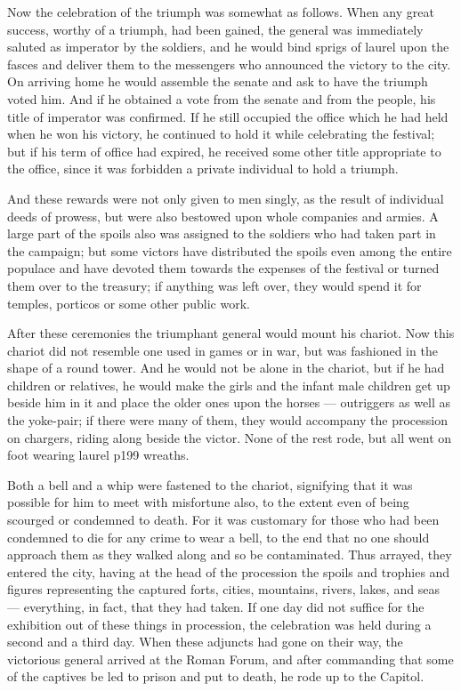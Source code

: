 Now the celebration of the triumph was somewhat as follows. When any great success, worthy of a triumph, had been gained, the general was immediately saluted as imperator by the soldiers, and he would bind sprigs of laurel upon the fasces and deliver them to the messengers who announced the victory to the city. On arriving home he would assemble the senate and ask to have the triumph voted him. And if he obtained a vote from the senate and from the people, his title of imperator was confirmed. If he still occupied the office which he had held when he won his victory, he continued to hold it while celebrating the festival; but if his term of office had expired, he received some other title appropriate to the office, since it was forbidden a private individual to hold a triumph.

And these rewards were not only given to men singly, as the result of individual deeds of prowess, but were also bestowed upon whole companies and armies. A large part of the spoils also was assigned to the soldiers who had taken part in the campaign; but some victors have distributed the spoils even among the entire populace and have devoted them towards the expenses of the festival or turned them over to the treasury; if anything was left over, they would spend it for temples, porticos or some other public work.

After these ceremonies the triumphant general would mount his chariot. Now this chariot did not resemble one used in games or in war, but was fashioned in the shape of a round tower. And he would not be alone in the chariot, but if he had children or relatives, he would make the girls and the infant male children get up beside him in it and place the older ones upon the horses \texthebrew{—} outriggers as well as the yoke-pair; if there were many of them, they would accompany the procession on chargers, riding along beside the victor. None of the rest rode, but all went on foot wearing laurel p199 wreaths.

Both a bell and a whip were fastened to the chariot, signifying that it was possible for him to meet with misfortune also, to the extent even of being scourged or condemned to death. For it was customary for those who had been condemned to die for any crime to wear a bell, to the end that no one should approach them as they walked along and so be contaminated. Thus arrayed, they entered the city, having at the head of the procession the spoils and trophies and figures representing the captured forts, cities, mountains, rivers, lakes, and seas \texthebrew{—} everything, in fact, that they had taken. If one day did not suffice for the exhibition out of these things in procession, the celebration was held during a second and a third day. When these adjuncts had gone on their way, the victorious general arrived at the Roman Forum, and after commanding that some of the captives be led to prison and put to death, he rode up to the Capitol.

